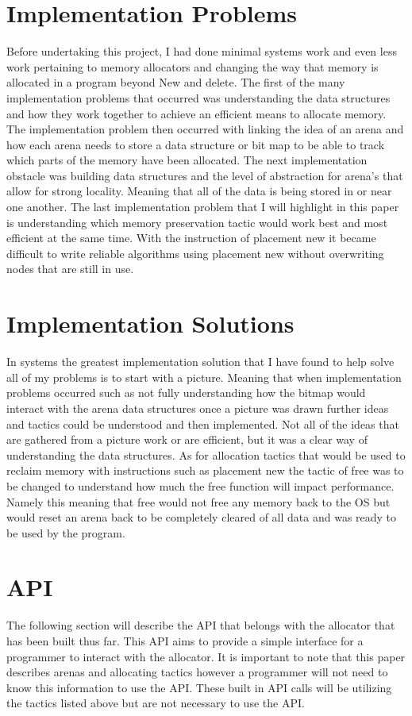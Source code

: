 \documentclass[conference]{IEEEtran}
\begin{document}
\section{Implementation Problems}
Before undertaking this project, I had done minimal systems work and even less work pertaining to memory allocators and changing the way that memory is allocated in a program beyond New and delete. The first of the many implementation problems that occurred was understanding the data structures and how they work together to achieve an efficient means to allocate memory. The implementation problem then occurred with linking the idea of an arena and how each arena needs to store a data structure or bit map to be able to track which parts of the memory have been allocated. The next implementation obstacle was building data structures and the level of abstraction for arena’s that allow for strong locality. Meaning that all of the data is being stored in or near one another. The last implementation problem that I will highlight in this paper is understanding which memory preservation tactic would work best and most efficient at the same time. With the instruction of placement new it became difficult to write reliable algorithms using placement new without overwriting nodes that are still in use.  
\section{Implementation Solutions}
In systems the greatest implementation solution that I have found to help solve all of my problems is to start with a picture. Meaning that when implementation problems occurred such as not fully understanding how the bitmap would interact with the arena data structures once a picture was drawn further ideas and tactics could be understood and then implemented. Not all of the ideas that are gathered from a picture work or are efficient, but it was a clear way of understanding the data structures. As for allocation tactics that would be used to reclaim memory with instructions such as placement new the tactic of free was to be changed to understand how much the free function will impact performance. Namely this meaning that free would not free any memory back to the OS but would reset an arena back to be completely cleared of all data and was ready to be used by the program. 



\section{API}
The following section will describe the API that belongs with the allocator that has been built thus far. This API aims to provide a simple interface for a programmer to interact with the allocator. It is important to note that this paper describes arenas and allocating tactics however a programmer will not need to know this information to use the API. These built in API calls will be utilizing the tactics listed above but are not necessary to use the API. 
\end{document}

